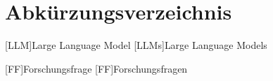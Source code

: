 \section*{Abkürzungsverzeichnis}
\begin{acronym}

    [LLM]{Large Language Model}
    [LLMs]{Large Language Models}

    [FF]{Forschungsfrage}
    [FF]{Forschungsfragen}
\end{acronym}